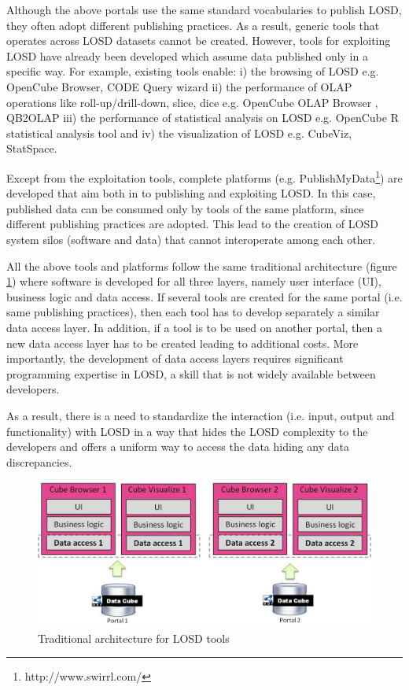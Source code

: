 \documentclass{llncs}
\begin{document}
Although the above portals use the same standard vocabularies to publish LOSD, they often adopt different publishing practices. As a result, generic tools that operates across LOSD datasets cannot be created. However, tools for exploiting LOSD have already been developed which assume data published only in a specific way. For example, existing tools enable: i) the browsing of LOSD e.g. OpenCube Browser\cite{Kalampokis:2014}, CODE Query wizard\cite{CODE:2014} ii) the performance of OLAP operations like roll-up/drill-down, slice, dice e.g. OpenCube OLAP Browser \cite{KalampokisIAOS}, QB2OLAP\cite{QB2OLAP} iii) the performance of  statistical analysis on LOSD e.g. OpenCube R statistical analysis tool\cite{Kalampokis:2014} and iv) the visualization of LOSD e.g. CubeViz\cite{Cubeviz}, StatSpace\cite{Statspace}.

Except from the exploitation tools, complete platforms (e.g. PublishMyData\footnote{http://www.swirrl.com/}) are developed that aim both in to publishing and exploiting LOSD. In this case, published data can be consumed only by tools of the same platform, since different publishing practices are adopted. This lead to the creation of LOSD system silos (software and data) that cannot interoperate among each other.

All the above tools and platforms follow the same traditional architecture (figure \ref{fig:asis}) where software is developed for all three layers, namely user interface (UI), business logic and data access. If several tools are created for the same portal (i.e. same publishing practices), then each tool has to develop separately  a similar data access layer. In addition, if a tool is to be used on another portal, then a new data access layer has to be created leading to additional costs. More importantly, the development of data access layers requires significant programming expertise in LOSD, a skill that is not widely available between developers.

As a result, there is a need to standardize the interaction (i.e. input, output and functionality) with LOSD in a way that hides the LOSD complexity to the developers and offers a uniform way to access the data hiding any data discrepancies. 


\begin{figure}
\begin{center}
  \includegraphics[width=120mm]{images/asis.jpg}
  \end{center}
\caption{Traditional architecture for LOSD tools}
\label{fig:asis}
\end{figure}
\end{document}
